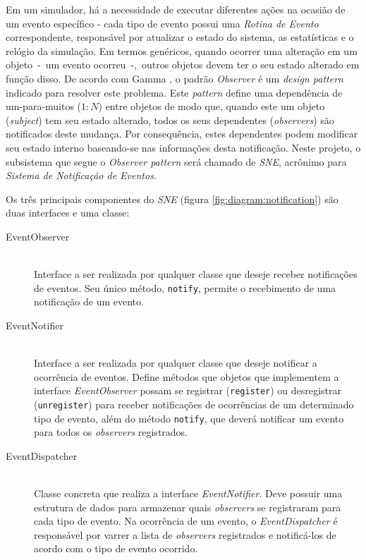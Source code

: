 Em um simulador, há a necessidade de executar diferentes ações na ocasião de um
evento específico - cada tipo de evento possui uma \textit{Rotina de Evento}
correspondente, responsável por atualizar o estado do sistema, as estatísticas e
o relógio da simulação. Em termos genéricos, quando ocorrer uma alteração em um
objeto~-~um evento ocorreu~-,~outros objetos devem ter o seu estado alterado em
função disso. De acordo com Gamma \cite{Gamma:1995:DPE:186897}, o padrão
\textit{Observer} é um \textit{design pattern} indicado para resolver este
problema. Este \textit{pattern} define uma dependência de um-para-muitos ($1:N$)
entre objetos de modo que, quando este um objeto (\textit{subject}) tem seu
estado alterado, todos os seus dependentes (\textit{observers}) são notificados
deste mudança. Por consequência, estes dependentes podem modificar seu estado
interno baseando-se nas informações desta notificação. Neste projeto, o
subsistema que segue o \textit{Observer pattern} será chamado de \textit{SNE},
acrônimo para \textit{Sistema de Notificação de Eventos}.

Os três principais componentes do \textit{SNE} (figura
\ref{fig:diagram:notification}) são duas interfaces e uma classe:

\begin{description}
  \item[EventObserver] \hfill \\
    Interface a ser realizada por qualquer classe que deseje receber
    notificações de eventos. Seu único método, \texttt{notify}, permite o
    recebimento de uma notificação de um evento.

  \item[EventNotifier] \hfill \\
    Interface a ser realizada por qualquer classe que deseje notificar a
    ocorrência de eventos. Define métodos que objetos que implementem a
    interface \textit{EventObserver} possam se registrar (\texttt{register}) ou
    desregistrar (\texttt{unregister}) para receber notificações de ocorrências
    de um determinado tipo de evento, além do método \texttt{notify}, que deverá
    notificar um evento para todos os \textit{observers} registrados.

\item[EventDispatcher] \hfill \\
    Classe concreta que realiza a interface \textit{EventNotifier}. Deve possuir
    uma estrutura de dados para armazenar quais \textit{observers} se
    registraram para cada tipo de evento. Na ocorrência de um evento, o
    \textit{EventDispatcher} é responsável por varrer a lista de
    \textit{observers} registrados e notificá-los de acordo com o tipo de evento
    ocorrido.

\end{description}

